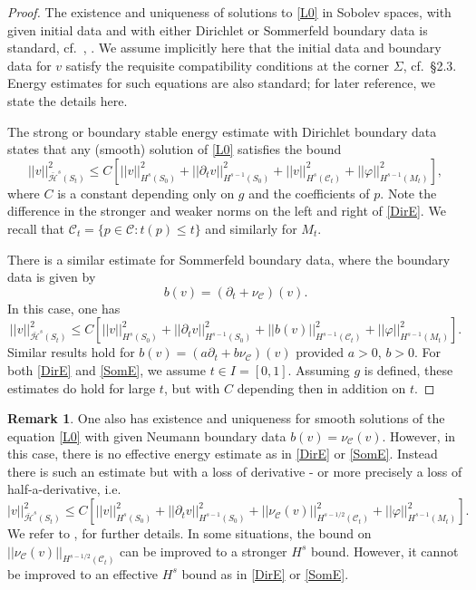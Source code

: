 \documentclass[10pt]{amsart}
\newcommand{\f}{\varphi}
\newcommand{\Si}{\Sigma}
\newcommand{\cC}{{\mathcal C}}
\newcommand{\cH}{{\mathcal H}}
\newcommand{\be}{\begin{equation}}
\newcommand{\ee}{\end{equation}}
\newcommand{\p}{\partial}
\newcommand{\<}{\langle}
\renewcommand{\>}{\rangle}
\theoremstyle{plain}
\theoremstyle{remark}
\theoremstyle{definition}
\newtheorem{remark}[lemma]{Remark}
\numberwithin{equation}{section}
\begin{document}
\begin{proof} 

  The existence and uniqueness of solutions to \eqref{L0} in Sobolev spaces, with given initial data and with either Dirichlet or 
Sommerfeld boundary data is standard, cf.~\cite{BS}, \cite{Sa}. We assume implicitly here that the initial data and boundary data for $v$ satisfy the 
requisite compatibility conditions at the corner $\Si$, cf.~\S 2.3. Energy estimates for such equations are also standard; for later reference, 
we state the details here. 

  The strong or boundary stable energy estimate with Dirichlet boundary data states that any (smooth) solution of \eqref{L0} satisfies 
the bound 
\be \label{DirE}
||v||_{\bar \cH^s(S_t)}^2 \leq C[||v||_{H^s(S_0)}^2 + ||\p_t v||_{H^{s-1}(S_0)}^2 + ||v||_{H^s(\cC_t)}^2 + ||\f||_{H^{s-1}(M_t)}^2],
\ee
where $C$ is a constant depending only on $g$ and the coefficients of $p$. Note the difference in the stronger and weaker norms on the left 
and right of \eqref{DirE}. We recall that $\cC_t = \{p \in \cC: t(p) \leq t\}$ and similarly for $M_t$. 

  There is a similar estimate for Sommerfeld boundary data, where the boundary data is given by 
$$b(v) = (\p_t + \nu_{\cC})(v).$$
In this case, one has  
\be \label{SomE}
||v||_{\bar \cH^s(S_t)}^2 \leq C[||v||_{H^s(S_0)}^2 + ||\p_t v||_{H^{s-1}(S_0)}^2 + ||b(v)||_{H^{s-1}(\cC_t)}^2 + ||\f||_{H^{s-1}(M_t)}^2].
\ee
Similar results hold for $b(v) = (a \p_t + b \nu_{\cC})(v)$ provided $a > 0$, $b > 0$. For both \eqref{DirE} and \eqref{SomE}, we assume 
$t \in I = [0,1]$. Assuming $g$ is defined, these estimates do hold for large $t$, but with $C$ depending then in addition on $t$. 

\end{proof}

\begin{remark} \label{Neumann} 
{\rm One also has existence and uniqueness for smooth solutions of the equation \eqref{L0} with given Neumann boundary data $b(v) = \nu_{\cC}(v)$. 
However, in this case, there is no effective energy estimate as in \eqref{DirE} or \eqref{SomE}. Instead there is such an estimate but with a loss 
of derivative - or more precisely a loss of half-a-derivative, i.e.
\be \label{NeuE}
|v||_{\bar \cH^s(S_t)}^2 \leq C[||v||_{H^s(S_0)}^2 + ||\p_t v||_{H^{s-1}(S_0)}^2 + ||\nu_{\cC}(v)||_{H^{s-1/2}(\cC_t)}^2 + ||\f||_{H^{s-1}(M_t)}^2].
\ee
We refer to \cite[Ch.8]{MT}, \cite{Tat} for further details. In some situations, the bound on $||\nu_{\cC}(v)||_{H^{s-1/2}(\cC_t)}$ can be improved to a stronger 
$H^s$ bound. However, it cannot be improved to an effective $H^s$ bound as in \eqref{DirE} or \eqref{SomE}. 
}
\end{remark}
\end{document}
